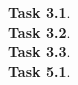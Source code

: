 \documentclass[11pt]{article}
\newcommand{\task}[1]{\clearpage\textbf{Task #1}. \\[0.5em]}
\newcommand{\eeq}{\ensuremath{\cong}}
\newcommand{\code}[2][]{{\sloppy
\ifmmode
    \text{\lstinline[language=sml,style=15150code,#1]`#2`}
\else
    {\lstinline[language=sml,style=15150code,#1]`#2`}%
\fi}}
\newcommand{\codefile}[2][]{}
\begin{document}





\task{3.1}

\task{3.2}

\task{3.3}

\task{5.1}
\end{document}
